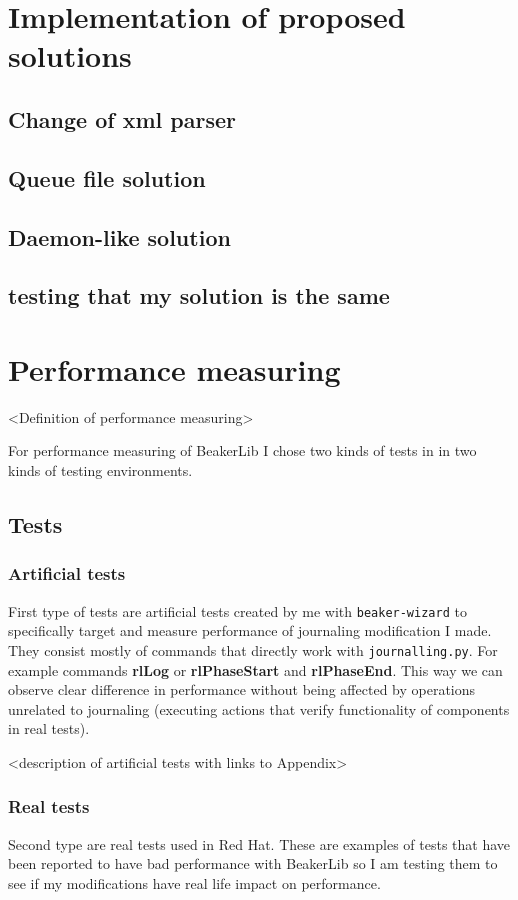 \chapter{Implementation of proposed solutions}

\section{Change of xml parser}
\section{Queue file solution}
\section{Daemon-like solution}

\section{testing that my solution is the same}

\chapter{Performance measuring}
<Definition of performance measuring>

For performance measuring of BeakerLib I chose two kinds of tests in in two kinds of testing environments.

\section{Tests}

\subsection{Artificial tests}
First type of tests are artificial tests created by me with \texttt{beaker-wizard} to specifically target and measure performance of journaling modification I made. They consist mostly of commands that directly work with \texttt{journalling.py}. For example commands \textbf{rlLog} or \textbf{rlPhaseStart} and \textbf{rlPhaseEnd}. This way we can observe clear difference in performance without being affected by operations unrelated to journaling (executing actions that verify functionality of components in real tests). 

<description of artificial tests with links to Appendix>

\subsection{Real tests}
Second type are real tests used in Red Hat. These are examples of tests that have been reported to have bad performance with BeakerLib so I am testing them to see if my modifications have real life impact on performance.

